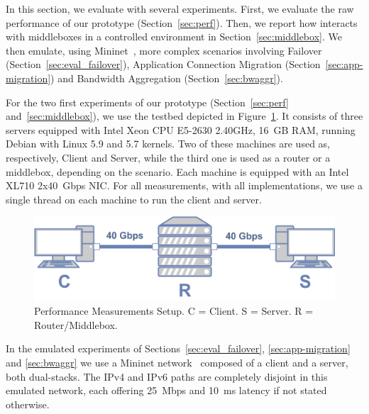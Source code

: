 
In this section, we evaluate \tcpls with several experiments.
First, we evaluate the raw performance of our \tcpls prototype
(Section~\ref{sec:perf}). Then, we report how \tcpls
interacts with middleboxes in a controlled environment in 
Section~\ref{sec:middlebox}. We then emulate, using
Mininet~\cite{handigol2012reproducible}, more complex scenarios involving 
Failover (Section~\ref{sec:eval_failover}), Application Connection Migration 
(Section~\ref{sec:app-migration}) and Bandwidth Aggregation 
(Section~\ref{sec:bwaggr}).

For the two first experiments of 
our \tcpls prototype (Section~\ref{sec:perf} and~\ref{sec:middlebox}), we use 
the 
testbed depicted
in Figure~\ref{fig:perf_testbed}. It consists of three servers equipped
with Intel Xeon CPU E5-2630 2.40GHz, 16~GB RAM, running
Debian with Linux 5.9 and 5.7 kernels. Two of these machines are used as,
respectively, Client and Server, while the third one is used as a router or a
middlebox, depending on the scenario. Each machine is equipped with an Intel
XL710 2x40~Gbps NIC. For all measurements, with all implementations, we use a 
single thread on each machine to run the client and server.

\begin{figure}[!t]
	\begin{center}
		\includegraphics[width=.6\columnwidth]{figures/testbed.png}
	\end{center}
	\caption{Performance Measurements Setup. C = Client. S = Server. R = 
	Router/Middlebox.}
	\label{fig:perf_testbed}
\end{figure}

In the emulated experiments of Sections~\ref{sec:eval_failover}, 
\ref{sec:app-migration} and \ref{sec:bwaggr} we use a Mininet 
network~\cite{handigol2012reproducible} composed of a client and a server, both 
dual-stacks. The IPv4 and IPv6 paths are completely disjoint in this emulated 
network, each offering 25~Mbps and 10~ms latency if not stated otherwise. 





